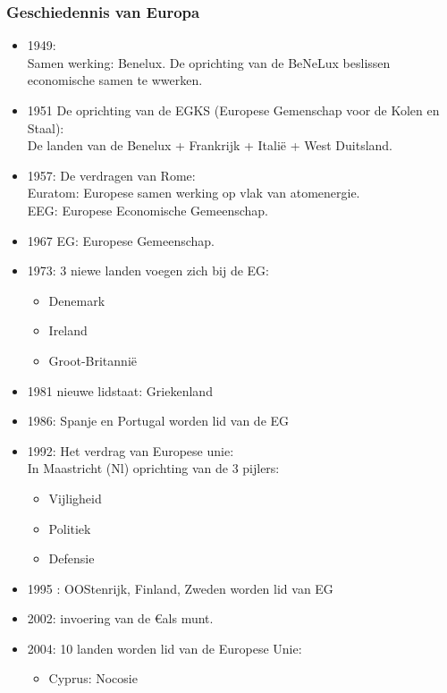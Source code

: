 \documentclass{article}
\begin{document}
\subsubsection{Geschiedennis van Europa}
\begin{itemize}
    \item 1949:\\
    Samen werking: Benelux. De oprichting van de BeNeLux beslissen economische samen te wwerken.
    \item 1951 De oprichting van de EGKS (Europese Gemenschap voor de Kolen en Staal):\\
    De landen van de Benelux + Frankrijk + Italië + West Duitsland.
    \item 1957: De verdragen van Rome:\\
    Euratom: Europese samen werking op vlak van atomenergie.\\
    EEG: Europese Economische Gemeenschap.
    \item 1967 EG:
    Europese Gemeenschap.
    \item 1973: 3 niewe landen voegen zich bij de EG:
    \begin{itemize}
        \item Denemark
        \item Ireland
        \item Groot-Britannië
    \end{itemize}
    \item 1981 nieuwe lidstaat: Griekenland
    \item 1986: Spanje en Portugal worden lid van de EG
    \item 1992: Het verdrag van Europese unie:\\
    In Maastricht (Nl) oprichting van de 3 pijlers:
    \begin{itemize}
        \item Vijligheid
        \item Politiek
        \item Defensie
    \end{itemize}
    \item 1995 : OOStenrijk, Finland, Zweden worden lid van EG
    \item 2002: invoering van de \euro als munt.
    \item 2004: 10 landen worden lid van de Europese Unie:
    \begin{multicols}{2}
        \begin{itemize}
            \item Cyprus: Nocosie

\end{itemize}
\end{multicols}
\end{itemize}
\end{document}
